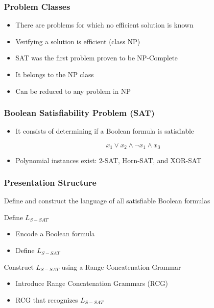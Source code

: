 \documentclass{beamer}
\begin{document}
\begin{frame}
    \frametitle{Problem Classes}

    \begin{itemize}
        \item There are problems for which no efficient solution is known
              \pause
        \item Verifying a solution is efficient (class NP)
              \pause
        \item SAT was the first problem proven to be NP-Complete
              \pause
        \item It belongs to the NP class
              \pause
        \item Can be reduced to any problem in NP
    \end{itemize}
\end{frame}

\begin{frame}
    \frametitle{Boolean Satisfiability Problem (SAT)}

    \begin{itemize}
        \item It consists of determining if a Boolean formula is satisfiable
              \begin{Large}
                  $$x_1\vee x_2 \wedge \neg x_1 \wedge x_3$$
              \end{Large}
              \pause
        \item Polynomial instances exist: 2-SAT, Horn-SAT, and XOR-SAT
    \end{itemize}
\end{frame}

\begin{frame}
    \frametitle{Presentation Structure}

    Define and construct the language of all satisfiable Boolean formulas

    \pause

    \begin{block}{Define $L_{S-SAT}$}
        \begin{itemize}
            \item Encode a Boolean formula
            \item Define $L_{S-SAT}$
        \end{itemize}
    \end{block}

    \pause

    \begin{block}{Construct $L_{S-SAT}$ using a Range Concatenation Grammar}
        \begin{itemize}
            \item Introduce Range Concatenation Grammars (RCG)
            \item RCG that recognizes $L_{S-SAT}$
        \end{itemize}
    \end{block}
\end{frame}
\end{document}
